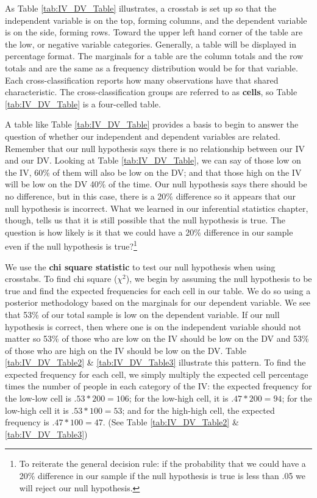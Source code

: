 \documentclass[11pt,openany]{book}\usepackage[]{graphicx}\usepackage[]{color}
\begin{document}
As Table \ref{tab:IV_DV_Table} illustrates, a crosstab is set up so that the independent variable is on the top, forming columns, and the dependent variable is on the side, forming rows.   Toward the upper left hand corner of the table are the low, or negative variable categories.  Generally, a table will be displayed in percentage format.  The marginals for a table are the column totals and the row totals and are the same as a frequency distribution would be for that variable.   Each cross-classification reports how many observations have that shared characteristic.  The cross-classification groups are referred to as \textbf{cells}, so Table \ref{tab:IV_DV_Table} is a four-celled table.

A table like Table \ref{tab:IV_DV_Table} provides a basis to begin to answer the question of whether our independent and dependent variables are related.  Remember that our null hypothesis says there is no relationship between our IV and our DV.  Looking at Table \ref{tab:IV_DV_Table}, we can say of those low on the IV, 60\% of them will also be low on the DV; and that those high on the IV will be low on the DV 40\% of the time.  Our null hypothesis says there should be no difference, but in this case, there is a 20\% difference so it appears that our null hypothesis is incorrect.  What we learned in our inferential statistics chapter, though, tells us that it is still possible that the null hypothesis is true. The question is how likely is it that we could have a 20\% difference in our sample even if the null hypothesis is true?\footnote{To reiterate the general decision rule: if the probability that we could have a 20\% difference in our sample if the null hypothesis is true is less than .05 we will reject our null hypothesis.}

We use the \textbf{chi square statistic} to test our null hypothesis when using crosstabs.  To find chi square ($\chi^2$), we begin by assuming the null hypothesis to be true and find the expected frequencies for each cell in our table.   We do so using a posterior methodology based on the marginals for our dependent variable.   We see that 53\% of our total sample is low on the dependent variable.   If our null hypothesis is correct, then where one is on the independent variable should not matter so 53\% of those who are low on the IV should be low on the DV and 53\% of those who are high on the IV should be low on the DV.  Table \ref{tab:IV_DV_Table2} \& \ref{tab:IV_DV_Table3} illustrate this pattern.  To find the expected frequency for each cell, we simply multiply the expected cell percentage times the number of people in each category of the IV:  the expected frequency for the low-low cell is $.53 * 200 = 106$; for the low-high cell, it is $.47 * 200 = 94$; for the low-high cell it is $.53 * 100 = 53$; and for the high-high cell, the expected frequency is $.47 * 100 = 47$.  (See Table \ref{tab:IV_DV_Table2} \& \ref{tab:IV_DV_Table3})
\end{document}

